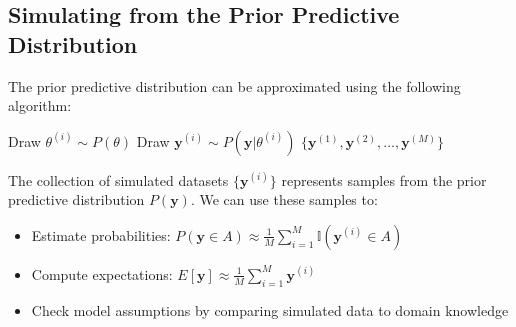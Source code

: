 \subsection{Simulating from the Prior Predictive Distribution}
The prior predictive distribution can be approximated using the following algorithm:

\begin{algorithmbox}
\begin{algorithm}[H]
\caption{Prior Predictive Simulation}
\begin{algorithmic}[1]
    \State Draw $\theta^{(i)} \sim P(\theta)$ 
    \State Draw $\mathbf{y}^{(i)} \sim P(\mathbf{y}|\theta^{(i)})$ 
\EndFor
\State \Return $\{\mathbf{y}^{(1)}, \mathbf{y}^{(2)}, \dots, \mathbf{y}^{(M)}\}$
\end{algorithmic}
\end{algorithm}
\end{algorithmbox}

The collection of simulated datasets $\{\mathbf{y}^{(i)}\}$ represents samples from the prior predictive distribution $P(\mathbf{y})$. We can use these samples to:
\begin{itemize}
\item Estimate probabilities: $P(\mathbf{y} \in A) \approx \frac{1}{M}\sum_{i=1}^M \mathbb{I}(\mathbf{y}^{(i)} \in A)$
\item Compute expectations: $E[\mathbf{y}] \approx \frac{1}{M}\sum_{i=1}^M \mathbf{y}^{(i)}$
\item Check model assumptions by comparing simulated data to domain knowledge
\end{itemize}

